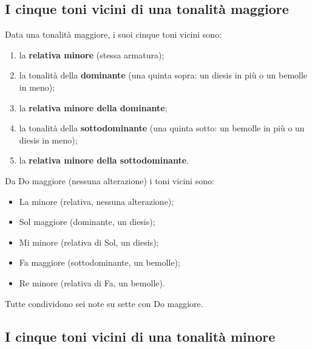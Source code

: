 \subsection{I cinque toni vicini di una tonalità maggiore}
\label{subsec:toni_vicini_maggiore}

\begin{regola}
	\label{reg:toni_vicini_maggiore}
	Data una tonalità maggiore, i suoi cinque toni vicini sono:
	\begin{enumerate}
		\item la \textbf{relativa minore} (stessa armatura);
		\item la tonalità della \textbf{dominante} (una quinta sopra: un diesis in più o un bemolle in meno);
		\item la \textbf{relativa minore della dominante};
		\item la tonalità della \textbf{sottodominante} (una quinta sotto: un bemolle in più o un diesis in meno);
		\item la \textbf{relativa minore della sottodominante}.
	\end{enumerate}
\end{regola}

\begin{esempio}
	\label{ex:toni_vicini_do}
	Da Do maggiore (nessuna alterazione) i toni vicini sono:
	\begin{itemize}
		\item La minore (relativa, nessuna alterazione);
		\item Sol maggiore (dominante, un diesis);
		\item Mi minore (relativa di Sol, un diesis);
		\item Fa maggiore (sottodominante, un bemolle);
		\item Re minore (relativa di Fa, un bemolle).
	\end{itemize}
	Tutte condividono sei note su sette con Do maggiore.
\end{esempio}

\subsection{I cinque toni vicini di una tonalità minore}
\label{subsec:toni_vicini_minore}

